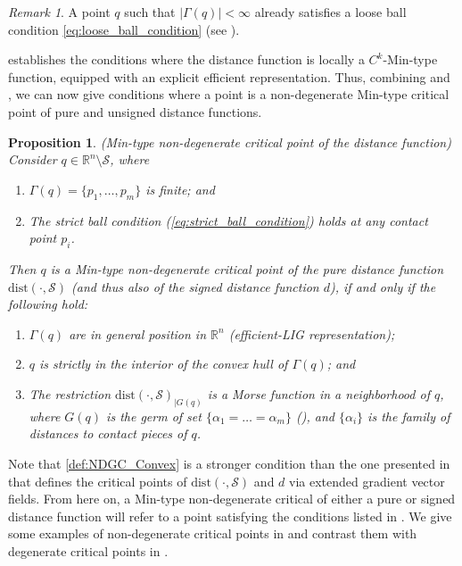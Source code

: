 \documentclass[11pt]{article}
\newcommand{\R}{\mathbb{R}}
\newcommand{\dist}{\mathrm{dist}}
\newcommand{\Surf}{\mathcal{S}}
\theoremstyle{plain}
\newtheorem{prop}{Proposition}
\theoremstyle{definition}
\theoremstyle{remark}
\newtheorem{rmk}{Remark}
\begin{document}
\begin{rmk}
    
A point $q$ such that $|\Gamma(q)| < \infty$ already satisfies a loose ball condition \eqref{eq:loose_ball_condition}
(see \cite[Proposition 6.1]{niyogi_finding_2008}).
\end{rmk}

 establishes the conditions where the distance function is locally a $C^k$-Min-type function, equipped with an explicit efficient representation. Thus,  combining   and , we can now give conditions where a point is a non-degenerate Min-type critical point of pure and unsigned distance functions. 

\begin{prop}(Min-type non-degenerate critical point of the distance function)
	\label{def:ndg_crit_dist}
Consider $q \in \R^n \setminus \Surf$, where
\begin{enumerate}[label=(N\arabic*), ref=(N\arabic*), start=1]
\item $\Gamma(q) = \{p_1,\ldots,p_m\}$ is finite; and \label{def:NDGC_Finite}
\item The strict ball condition (\cref{eq:strict_ball_condition}) holds at any contact point $p_i$. \label{def:NDGC_StrictBall}
\end{enumerate}
Then $q$ is a \emph{Min-type non-degenerate critical point of the pure distance function $\dist(\cdot, \Surf)$} (and thus also of the signed distance function $d$), if and only if the following hold:
\begin{enumerate}[label=(N3\alph*), ref=(N3\alph*)]
\item $\Gamma(q)$ are in general position in $\R^n$ (efficient-LIG representation);\label{def:NDGC_LIG}
\item $q$ is strictly in the interior of the convex hull of $\Gamma(q)$; and\label{def:NDGC_Convex} 
\item The restriction $\dist(\cdot, \Surf)_{|G(q)}$ is a Morse function in a neighborhood of $q$, where $G(q)$ is the germ of set $\{\alpha_1 = \ldots = \alpha_m\}$ (), and  $\{\alpha_i\}$ is the family of distances to contact pieces of $q$. \label{def:NDGC_MorseGerm}
\end{enumerate}
\end{prop}

Note that \ref{def:NDGC_Convex} is a stronger condition than the one presented in  that defines the critical points of $\dist(\cdot, \Surf)$ and $d$ via extended gradient vector fields. From here on, a Min-type non-degenerate critical of either a pure or signed distance function will refer to a point satisfying the conditions listed in . We give some examples of non-degenerate critical points in  and contrast them with degenerate critical points in .
\end{document}

